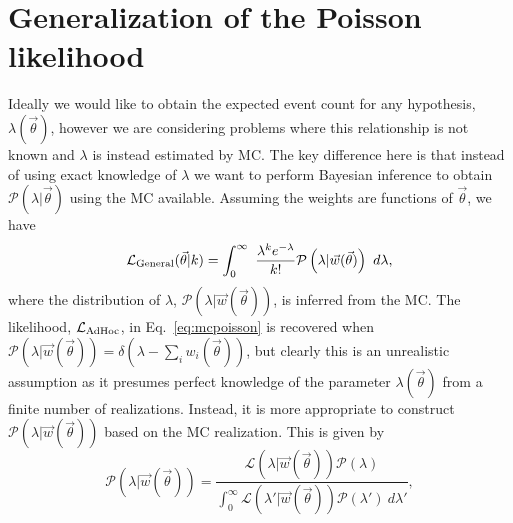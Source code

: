 \documentclass[a4paper, 11pt]{article}
\newcommand{\like}{\mathcal{L}}
\newcommand{\vectheta}{\vec{\theta}}
\newcommand{\vecw}{\vec{w}}
\newcommand{\prob}{\mathcal{P}}
\newcommand{\adhoc}{\mathcal{L}_{\textmd{AdHoc}}}
\begin{document}
\section{Generalization of the Poisson likelihood\label{sec:generalization_poisson}}


Ideally we would like to obtain the expected event count for any hypothesis, $\lambda(\vectheta)$, however we are considering problems where this relationship is not known and $\lambda$ is instead estimated by MC. The key difference here is that instead of using exact knowledge of $\lambda$ we want to perform Bayesian inference to obtain $\prob(\lambda|\vectheta)$ using the MC available. Assuming the weights are functions of $\vectheta$, we have
\begin{equation} \label{eq:generalpoisson}
\like_{\rm General}(\vectheta|k) = \int_{0}^{\infty}~\frac{\lambda^{k}e^{-\lambda}}{k!}\prob\left(\lambda|\vecw(\vectheta)\right)~d\lambda,
\end{equation}
where the distribution of $\lambda$, $\prob\left(\lambda|\vecw(\vectheta)\right)$, is inferred from the MC. %
The likelihood, $\adhoc$, in Eq.~\eqref{eq:mcpoisson} is recovered when $\prob(\lambda|\vecw(\vectheta)) = \delta\left(\lambda - \sum_{i}{w_i(\vectheta)}\right)$, but clearly this is an unrealistic assumption as it presumes perfect knowledge of the parameter $\lambda(\vectheta)$ from a finite number of realizations. Instead, it is more appropriate to construct $\prob(\lambda|\vecw(\vectheta))$ based on the MC realization. This is given by
\begin{equation} \label{eq:posterior}
\prob\left(\lambda|\vecw(\vectheta)\right) = \frac{\like(\lambda|\vecw(\vectheta))\prob(\lambda)}{\int_0^\infty \like(\lambda'|\vecw(\vectheta))\prob(\lambda')~d\lambda'},
\end{equation}
\end{document}
